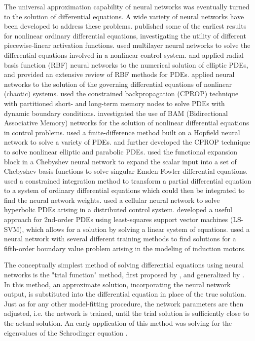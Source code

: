 \documentclass{article}
\begin{document}
The universal approximation capability of neural networks was eventually turned to the solution of differential equations. A wide variety of neural networks have been developed to address these problems. \cite{Meade1994} published some of the earliest results for nonlinear ordinary differential equations, investigating the utility of different piecewise-linear activation functions. \cite{He2000} used multilayer neural networks to  solve the differential equations involved in a nonlinear control system. \cite{Jianyu2003} and \cite{Mai-Duy2001} applied radial basis function (RBF) neural networks to the numerical solution of elliptic PDEs, and \cite{Kumar2011} provided an extensive review of RBF methods for PDEs. \cite{Smaoui2004} applied neural networks to the solution of the governing differential equations of nonlinear (chaotic) systems. \cite{DiMuro2009} used the constrained backpropagation (CPROP) technique with partitioned short- and long-term memory nodes to solve PDEs with dynamic boundary conditions. \cite{Zhou2009} investigated the use of BAM (Bidirectional Associative Memory) networks for the solution of nonlinear differential equations in control problems. \cite{Alharbi2010} used a finite-difference method built on a Hopfield neural network to solve a variety of PDEs. \cite{Rudd2013} and \cite{Rudd2014} further developed the CPROP technique to solve nonlinear elliptic and parabolic PDEs. \cite{Mall2015} used the functional expansion block in a Chebyshev neural network to expand the scalar input into a set of Chebyshev basis functions to solve singular Emden-Fowler differential equations. \cite{Rudd2015} used a constrained integration method to transform a partial differential equation to a system of ordinary differential equations which could then be integrated to find the neural network weights. \cite{Danciu2015} used a cellular neural network to solve hyperbolic PDEs arising in a distributed control system. \cite{Mehrkanoon2015} developed a useful approach for 2nd-order PDEs using least-squares support vector machines (LS-SVM), which allows for a solution by solving a linear system of equations. \cite{Ahmad2018} used a neural network with several different training methods to find solutions for a fifth-order boundary value problem arising in the modeling of induction motors.

The conceptually simplest method of solving differential equations using neural networks is the "trial function" method, first proposed by \cite{vanMilligen1995}, and generalized by \cite{Lagaris1998}. In this method, an approximate solution, incorporating the neural network output, is substituted into the differential equation in place of the true solution. Just as for any other model-fitting procedure, the network parameters are then adjusted, i.e. the network is trained, until the trial solution is sufficiently close to the actual solution. An early application of this method was solving for the eigenvalues of the Schrodinger equation \cite{Lagaris1997}.
\end{document}
